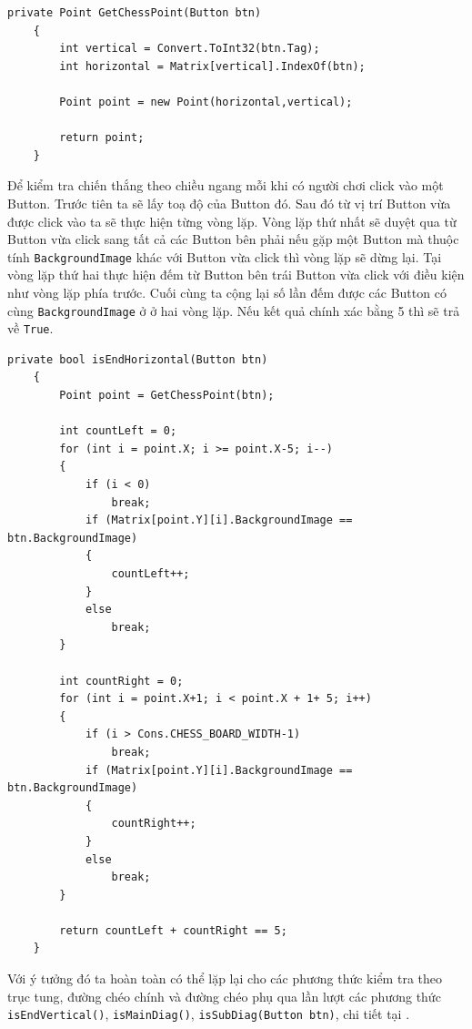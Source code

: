 \begin{lstlisting}[language={[Sharp]C},label={code:btn_Click}, caption = Phương thức \texttt{isEndGame()}]
	private Point GetChessPoint(Button btn)
	{
		int vertical = Convert.ToInt32(btn.Tag);
		int horizontal = Matrix[vertical].IndexOf(btn);
		
		Point point = new Point(horizontal,vertical);
	
		return point;
	}	
\end{lstlisting}

Để kiểm tra chiến thắng theo chiều ngang mỗi khi có người chơi click vào một Button. Trước tiên ta sẽ lấy toạ độ của Button đó. Sau đó từ vị trí Button vừa được click vào ta sẽ thực hiện từng vòng lặp. Vòng lặp thứ nhất sẽ duyệt qua từ Button vừa click sang tất cả các Button bên phải nếu gặp một Button mà thuộc tính \texttt{BackgroundImage} khác với Button vừa click thì vòng lặp sẽ dừng lại. Tại vòng lặp thứ hai thực hiện đếm từ Button bên trái Button vừa click với điều kiện như vòng lặp phía trước. Cuối cùng ta cộng lại số lần đếm được các Button có cùng \texttt{BackgroundImage} ở ở hai vòng lặp. Nếu kết quả chính xác bằng 5 thì sẽ trả về \texttt{True}.

\begin{lstlisting}[language={[Sharp]C},label={code:btn_Click}, caption = Phương thức \texttt{isEndHorizontal()} kiểm tra chiến thắng theo trục hoành]
	private bool isEndHorizontal(Button btn)
	{
		Point point = GetChessPoint(btn);

		int countLeft = 0;
		for (int i = point.X; i >= point.X-5; i--)
		{
			if (i < 0)
				break;
			if (Matrix[point.Y][i].BackgroundImage == btn.BackgroundImage)
			{
				countLeft++;
			}
			else
				break;
		}
		
		int countRight = 0;
		for (int i = point.X+1; i < point.X + 1+ 5; i++)
		{
			if (i > Cons.CHESS_BOARD_WIDTH-1)
				break;
			if (Matrix[point.Y][i].BackgroundImage == btn.BackgroundImage)
			{
				countRight++;
			}
			else
				break;
		}

		return countLeft + countRight == 5;
	}
\end{lstlisting}

Với ý tưởng đó ta hoàn toàn có thể lặp lại cho các phương thức kiểm tra theo trục tung, đường chéo chính và đường chéo phụ qua lần lượt các phương thức \texttt{isEndVertical()}, \texttt{isMainDiag()}, \texttt{isSubDiag(Button btn)}, chi tiết tại \cite{githubtrandattin}.